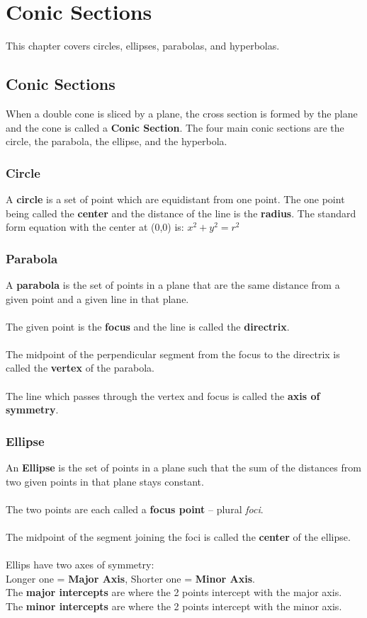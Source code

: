 \chapter{Conic Sections}
This chapter covers circles, ellipses, parabolas, and hyperbolas.
\section{Conic Sections}
When a double cone is sliced by a plane, the cross section is formed by the plane and the cone is called a \textbf{Conic Section}. The four main conic sections are the circle, the parabola, the ellipse, and the hyperbola.

\subsection{Circle}
A \textbf{circle} is a set of point which are equidistant from one point. The one point being called the \textbf{center} and the distance of the line is the \textbf{radius}. The standard form equation with the center at (0,0) is: $x^2 + y^2 = r^2$

\subsection{Parabola}
A \textbf{parabola} is the set of points in a plane that are the same distance from a given point and a given line in that plane.\\
\\The given point is the \textbf{focus} and the line is called the \textbf{directrix}.\\
\\The midpoint of the perpendicular segment from the focus to the directrix is called the \textbf{vertex} of the parabola.\\
\\The line which passes through the vertex and focus is called the \textbf{axis of symmetry}.
\newpage
\subsection{Ellipse}
An \textbf{Ellipse} is the set of points in a plane such that the sum of the distances from two given points in that plane stays constant.\\
\\The two points are each called a \textbf{focus point} -- plural \textit{foci}.\\
\\The midpoint of the segment joining the foci is called the \textbf{center} of the ellipse.\\
\\Ellips have two axes of symmetry: \\Longer one = \textbf{Major Axis}, Shorter one = \textbf{Minor Axis}.\\
The \textbf{major intercepts} are where the 2 points intercept with the major axis.\\
The \textbf{minor intercepts} are where the 2 points intercept with the minor axis.\\
\\

